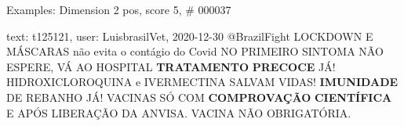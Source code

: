 \begin{frame}{Examples: Dimension 2 pos, score 5, \# 000037}
\footnotesize
\begin{exampleblock}{text: t125121, user: LuisbrasilVet, 2020-12-30}
@BrazilFight LOCKDOWN E MÁSCARAS não evita o contágio do Covid NO PRIMEIRO 
SINTOMA NÃO ESPERE, VÁ AO HOSPITAL \textbf{TRATAMENTO} \textbf{PRECOCE} JÁ! 
HIDROXICLOROQUINA e IVERMECTINA SALVAM VIDAS! \textbf{IMUNIDADE} DE REBANHO JÁ! 
VACINAS SÓ COM \textbf{COMPROVAÇÃO} \textbf{CIENTÍFICA} E APÓS LIBERAÇÃO DA 
ANVISA. VACINA NÃO OBRIGATÓRIA. 
\end{exampleblock}
\end{frame}
